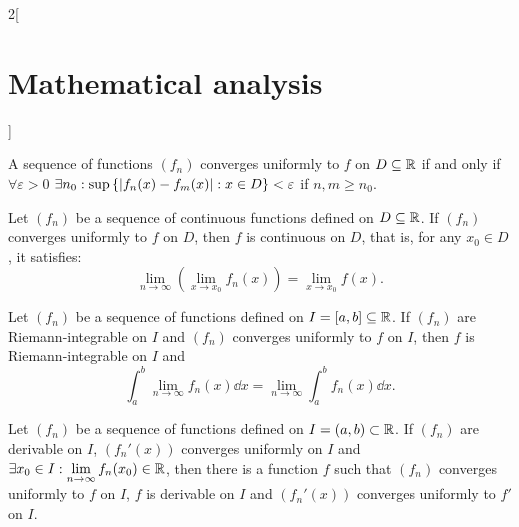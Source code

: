 \documentclass[../../../main.tex]{subfiles}
\begin{document}
\begin{multicols}{2}[\section{Mathematical analysis}]
\begin{theorem}
    A sequence of functions $(f_n)$ converges uniformly to $f$ on $D\subseteq\mathbb{R} $ if and only if $\forall\varepsilon>0$ $\displaystyle\exists n_0:\sup\left\{|f_n(x)-f_m(x)|:\\ x\in D\right\}< \varepsilon$ if $n,m\geq n_0$.
  \end{theorem}
  \begin{theorem}
    Let $(f_n)$ be a sequence of continuous functions defined on $D\subseteq\mathbb{R} $. If $(f_n)$ converges uniformly to $f$ on $D$, then $f$ is continuous on $D$, that is, for any $x_0\in D$, it satisfies: $$\lim_{n\to\infty}\left(\lim_{x\to x_0} f_n(x)\right)=\lim_{x\to x_0} f(x).$$
  \end{theorem}
  \begin{theorem}
    Let $(f_n)$ be a sequence of functions defined on  $I=[a,b]\subseteq\mathbb{R} $. If $(f_n)$ are Riemann-integrable on $I$ and $(f_n)$ converges uniformly to $f$ on $I$, then $f$ is Riemann-integrable on $I$ and $$\int_a^b\lim_{n\to\infty} f_n(x) \dd x=\lim_{n\to\infty} \int_a^bf_n(x) \dd x.$$
  \end{theorem}
  \begin{theorem}
    Let $(f_n)$ be a sequence of functions defined on $I=(a,b)\subset\mathbb{R} $. If $(f_n)$ are derivable on $I$, $(f_n'(x))$ converges uniformly on $I$ and $\displaystyle\exists x_0\in I: \lim_{n\to\infty}f_n(x_0)\in\mathbb{R} $, then there is a function $f$ such that $(f_n)$ converges uniformly to $f$ on $I$, $f$ is derivable on $I$ and $(f_n'(x))$ converges uniformly to $f'$ on $I$.
  \end{theorem}

\end{multicols}
\end{document}

